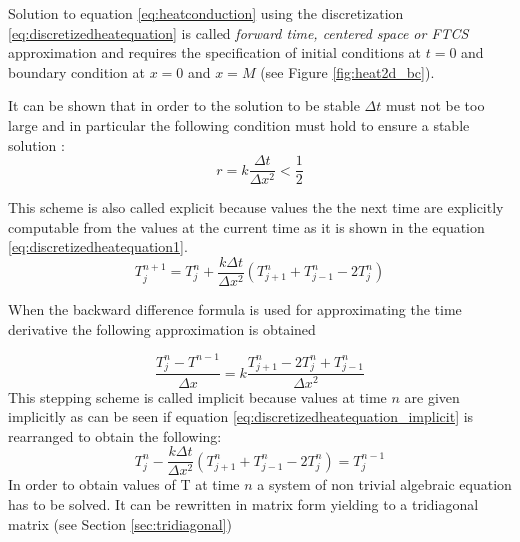 Solution to equation \ref{eq:heatconduction} using the discretization \ref{eq:discretizedheatequation} is called \textit{forward time, centered space or FTCS} approximation and requires the specification of initial conditions at $t=0$ and boundary condition at $x=0$ and $x=M$ (see Figure \ref{fig:heat2d_bc}).

It can be shown that in order to the solution to be stable $\Delta t$ must not be too large and in particular the following condition must hold to ensure a stable solution \cite{isaacson:1994,anderson:1994,crank:1996}:
\[ 
 r= k \frac{\Delta t}{\Delta x^2}< \frac{1}{2}
\]

This scheme is also called explicit because values the the next time are explicitly computable from the values at the current time as it is shown in the equation \ref{eq:discretizedheatequation1}.
 \begin{equation}
  T^{n+1}_{j} = T^n_{j} + \frac{k \Delta t}{\Delta x^2} (T^n_{j+1}+T^n_{j-1}-2T^n_{j})
 \label{eq:discretizedheatequation1}
 \end{equation}

When the backward difference formula is used for approximating the time derivative the following approximation is obtained

 \begin{equation}
  \frac{T^{n}_{j} - T^{n-1}_{}}{\Delta x} = k \frac{T^n_{j+1}- 2T^n_{j} + T^n_{j-1}}{\Delta x^2}
 \label{eq:discretizedheatequation_implicit}
 \end{equation}
 This stepping scheme is called implicit because values at time $n$ are given implicitly as can be seen if equation \ref{eq:discretizedheatequation_implicit} is rearranged to obtain the following: 
 \begin{equation}
T^n_{j} - \frac{k \Delta t}{\Delta x^2} (T^n_{j+1}+T^n_{j-1}-2T^n_{j}) =   T^{n-1}_{j}
 \label{eq:discretizedheatequation1}
 \end{equation}
 In order to obtain values of T at time $n$ a system of non trivial algebraic equation has to be solved. 
 It can be rewritten in matrix form yielding to a tridiagonal matrix (see Section \ref{sec:tridiagonal})

